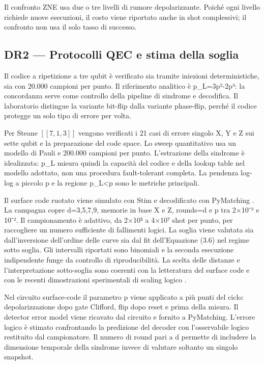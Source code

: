 Il confronto ZNE usa due o tre livelli di rumore depolarizzante. Poiché ogni livello richiede nuove esecuzioni, il costo viene riportato anche in shot complessivi; il confronto non usa il solo tasso di successo.

\subsection{DR2 --- Protocolli QEC e stima della soglia}\label{sec:finale_3_5_3}

Il codice a ripetizione a tre qubit è verificato sia tramite iniezioni deterministiche, sia con 20.000 campioni per punto. Il riferimento analitico è p\_L=3p²-2p³: la concordanza serve come controllo della pipeline di sindrome e decodifica. Il laboratorio distingue la variante bit-flip dalla variante phase-flip, perché il codice protegge un solo tipo di errore per volta.

Per Steane \ensuremath{[[7,1,3]]} vengono verificati i 21 casi di errore singolo X, Y e Z sui sette qubit e la preparazione del code space. Lo sweep quantitativo usa un modello di Pauli e 200.000 campioni per punto. L'estrazione della sindrome è idealizzata: p\_L misura quindi la capacità del codice e della lookup table nel modello adottato, non una procedura fault-tolerant completa. La pendenza log-log a piccolo p e la regione p\_L\textless p sono le metriche principali.

Il surface code ruotato viene simulato con Stim \cite{stim2021} e decodificato con PyMatching \cite{pymatching2021}. La campagna copre d=3,5,7,9, memorie in base X e Z, rounds=d e p tra 2×10⁻³ e 10⁻². Il campionamento è adattivo, da 2×10⁵ a 4×10⁷ shot per punto, per raccogliere un numero sufficiente di fallimenti logici. La soglia viene valutata sia dall'inversione dell'ordine delle curve sia dal fit dell'Equazione (3.6) nel regime sotto soglia. Gli intervalli riportati sono binomiali e la seconda esecuzione indipendente funge da controllo di riproducibilità. La scelta delle distanze e l'interpretazione sotto-soglia sono coerenti con la letteratura del surface code e con le recenti dimostrazioni sperimentali di scaling logico \cite{fowler2012,googleQECBelowThreshold2025,googleSurfaceCode2023,dennis2002topological}.

Nel circuito surface-code il parametro p viene applicato a più punti del ciclo: depolarizzazione dopo gate Clifford, flip dopo reset e prima della misura. Il detector error model viene ricavato dal circuito e fornito a PyMatching. L'errore logico è stimato confrontando la predizione del decoder con l'osservabile logico restituito dal campionatore. Il numero di round pari a d permette di includere la dimensione temporale della sindrome invece di valutare soltanto un singolo snapshot.

